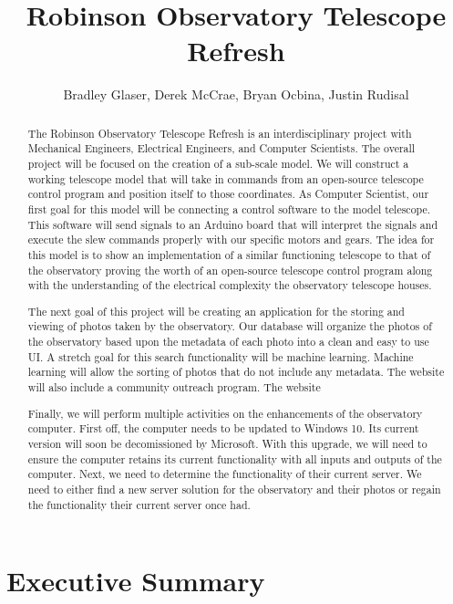 \documentclass[12pt]{report}
\title{Robinson Observatory Telescope Refresh}
\author{Bradley Glaser, Derek McCrae, Bryan Ocbina, Justin Rudisal}
\begin{document}
\onehalfspacing

\maketitle

\begin{abstract}
The Robinson Observatory Telescope Refresh is an interdisciplinary project with Mechanical Engineers, Electrical Engineers, and Computer Scientists. The overall project will be focused on the creation of a sub-scale model. We will construct a working telescope model that will take in commands from an open-source telescope control program and position itself to those coordinates. As Computer Scientist, our first goal for this model will be connecting a control software to the model telescope. This software will send signals to an Arduino board that will interpret the signals and execute the slew commands properly with our specific motors and gears. The idea for this model is to show an implementation of a similar functioning telescope to that of the observatory proving the worth of an open-source telescope control program along with the understanding of the electrical complexity the observatory telescope houses.

The next goal of this project will be creating an application for the storing and viewing of photos taken by the observatory. Our database will organize the photos of the observatory based upon the metadata of each photo into a clean and easy to use UI. A stretch goal for this search functionality will be machine learning. Machine learning will allow the sorting of photos that do not include any metadata. The website will also include a community outreach program. The website

Finally, we will perform multiple activities on the enhancements of the observatory computer. First off, the computer needs to be updated to Windows 10. Its current version will soon be decomissioned by Microsoft. With this upgrade, we will need to ensure the computer retains its current functionality with all inputs and outputs of the computer. Next, we need to determine the functionality of their current server. We need to either find a new server solution for the observatory and their photos or regain the functionality their current server once had.

\end{abstract}

\section*{Executive Summary}
\end{document}
